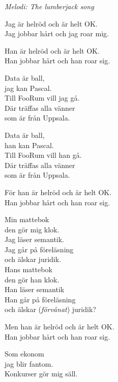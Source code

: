 {\footnotesize\textit{Melodi: The lumberjack song}}\par
\vspace{10pt}
Jag är helröd och är helt OK.\\
Jag jobbar hårt och jag roar mig.\par
\vspace{10pt}
Han är helröd och är helt OK.\\
Han jobbar hårt och han roar sig.\par
\vspace{10pt}
Data är ball,\\
jag kan Pascal.\\
Till FooRum vill jag gå.\\
Där träffas alla vänner\\
som är från Uppsala.\par
\vspace{10pt}
Data är ball,\\
han kan Pascal.\\
Till FooRum vill han gå.\\
Där träffas alla vänner\\
som är från Uppsala.\par
\vspace{10pt}
För han är helröd och är helt OK.\\
Han jobbar hårt och han roar sig.\par
\vspace{10pt}
Min mattebok\\
den gör mig klok.\\
Jag läser semantik.\\
Jag går på föreläsning\\
och älskar juridik.\\
\newpage
Hans mattebok\\
den gör han klok.\\
Han läser semantik\\
Han går på föreläsning\\
och älskar (\textit{förvånat}) juridik?\par
\vspace{10pt}
Men han är helröd och är helt OK.\\
Han jobbar hårt och han roar sig.\par
\vspace{10pt}
Som ekonom\\
jag blir fantom.\\
Konkurser gör mig säll.\\
